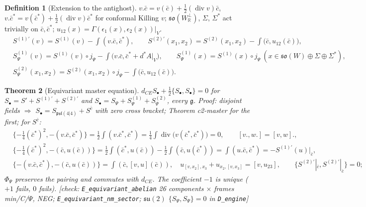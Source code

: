 \documentclass[11pt]{article}
\theoremstyle{plain}
\newtheorem{theorem}{Theorem}[section]
\theoremstyle{definition}
\newtheorem{definition}[theorem]{Definition}
\numberwithin{equation}{section}
\begin{document}
\begin{definition}[Extension to the antighost]
\label{def:eq}
$v.\bar c=v(\bar c)+\tfrac12(\operatorname{div}v)\bar c$, $v.\bar c^*=v(\bar c^*)+\tfrac12(\operatorname{div}v)\bar c^*$ for conformal Killing $v$; $\mathfrak{so}(W_{\mathbb R}^\perp)$, $\Sigma$, $\Sigma^*$ act trivially on $\bar c,\bar c^*$; $u_{12}(x)=\Gamma(\epsilon_1(x),\epsilon_2(x))|_V$.
\[
\begin{aligned}
&S^{(1)\prime}(v)=S^{(1)}(v)-\int(v.\bar c,\bar c^*),\qquad S^{(2)\prime}(x_1,x_2)=S^{(2)}(x_1,x_2)-\int\big(\bar c,u_{12}(\bar c)\big),\\
&S^{(1)}_\Psi(v)=S^{(1)}(v)\circ j_\Psi-\int\big(v.\bar c,\bar c^*+d^*A|_V\big),\qquad S^{(1)}_\Psi(x)=S^{(1)}(x)\circ j_\Psi\ (x\in\mathfrak{so}(W)\oplus\Sigma\oplus\Sigma^*),\\
&S^{(2)}_\Psi(x_1,x_2)=S^{(2)}(x_1,x_2)\circ j_\Psi-\int\big(\bar c,u_{12}(\bar c)\big).
\end{aligned}
\]
\end{definition}

\begin{theorem}[Equivariant master equation]
\label{thm:MC}
$d_{CE}S_\bullet+\tfrac12\{S_\bullet,S_\bullet\}=0$ for $S_\bullet=S'+S^{(1)\prime}+S^{(2)\prime}$ and $S_\bullet=S_\Psi+S^{(1)}_\Psi+S^{(2)}_\Psi$, every $\mathfrak g$. Proof: disjoint fields $\Rightarrow$ $S_\bullet=S_{\mathfrak{psl}(4|4)}+S^{\bar c}$ with zero cross bracket; Theorem c2-master for the first; for $S^{\bar c}$:
\[
\begin{aligned}
&\{-\tfrac14(\bar c^*)^2,-(v.\bar c,\bar c^*)\}=\tfrac12\int(v.\bar c^*,\bar c^*)=\tfrac14\int\operatorname{div}\big(v(\bar c^*,\bar c^*)\big)=0,\qquad [v.,w.]=[v,w].,\\
&\{-\tfrac14(\bar c^*)^2,-(\bar c,u(\bar c))\}=\tfrac12\int(\bar c^*,u(\bar c))-\tfrac12\int(\bar c,u(\bar c^*))=\int(u.\bar c,\bar c^*)=-S^{(1)\prime}(u)|_{\bar c},\\
&\{-(v.\bar c,\bar c^*),-(\bar c,u(\bar c))\}=\int(\bar c,[v,u](\bar c)),\quad u_{[v,x_2],x_3}+u_{x_2,[v,x_3]}=[v,u_{23}],\qquad \{S^{(2)\prime}|_{\bar c},S^{(2)\prime}|_{\bar c}\}=0;
\end{aligned}
\]
$\Phi_\Psi$ preserves the pairing and commutes with $d_{CE}$. The coefficient $-1$ is unique ($+1$ fails, $0$ fails). [check: \texttt{E\_equivariant\_abelian} 26 components $\times$ frames min/C/$\Psi$, NEG; \texttt{E\_equivariant\_nm\_sector}; $\mathfrak{su}(2)$ $\{S_\Psi,S_\Psi\}=0$ in \texttt{D\_engine}]
\end{theorem}
\end{document}
